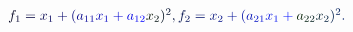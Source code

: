 \documentclass[12pt]{article}
\begin{document}
\makeatletter
\renewcommand*{\@textcolor}[3]{%
  \protect\leavevmode
  \begingroup
    \color#1{#2}#3%
  \endgroup
}
\makeatother
\begin{displaymath}
\begin{array} {c} \mathcolor[RGB]{0,0,15}{\textstyle} { \mathcolor[RGB]{0,0,30}{f} _ { \mathcolor[RGB]{0,0,45}{1} } \mathcolor[RGB]{0,0,60}{=} \mathcolor[RGB]{0,0,75}{x} _ { \mathcolor[RGB]{0,0,90}{1} } \mathcolor[RGB]{0,0,105}{+} \mathcolor[RGB]{0,0,120}{(} \mathcolor[RGB]{0,0,135}{a} _ { \mathcolor[RGB]{0,0,150}{1} \mathcolor[RGB]{0,0,165}{1} } \mathcolor[RGB]{0,0,180}{x} _ { \mathcolor[RGB]{0,0,195}{1} } \mathcolor[RGB]{0,0,210}{+} \mathcolor[RGB]{0,0,225}{a} _ { \mathcolor[RGB]{0,0,240}{1} \mathcolor[RGB]{0,0,255}{2} } \mathcolor[RGB]{0,15,0}{x} _ { \mathcolor[RGB]{0,15,15}{2} } \mathcolor[RGB]{0,15,30}{)} ^ { \mathcolor[RGB]{0,15,45}{2} } \mathcolor[RGB]{0,15,60}{,} \mathcolor[RGB]{0,15,75}{f} _ { \mathcolor[RGB]{0,15,90}{2} } \mathcolor[RGB]{0,15,105}{=} \mathcolor[RGB]{0,15,120}{x} _ { \mathcolor[RGB]{0,15,135}{2} } \mathcolor[RGB]{0,15,150}{+} \mathcolor[RGB]{0,15,165}{(} \mathcolor[RGB]{0,15,180}{a} _ { \mathcolor[RGB]{0,15,195}{2} \mathcolor[RGB]{0,15,210}{1} } \mathcolor[RGB]{0,15,225}{x} _ { \mathcolor[RGB]{0,15,240}{1} } \mathcolor[RGB]{0,15,255}{+} \mathcolor[RGB]{0,30,0}{a} _ { \mathcolor[RGB]{0,30,15}{2} \mathcolor[RGB]{0,30,30}{2} } \mathcolor[RGB]{0,30,45}{x} _ { \mathcolor[RGB]{0,30,60}{2} } \mathcolor[RGB]{0,30,75}{)} ^ { \mathcolor[RGB]{0,30,90}{2} } \mathcolor[RGB]{0,30,105}{.} } \end{array}
\end{displaymath}
\end{document}
